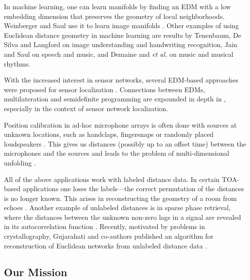 \documentclass[10pt,double]{IEEEtran}
\newcommand{\rev}[1]{{#1}}
\begin{document}
In machine learning, one can learn manifolds by finding an EDM with a low
embedding dimension that preserves the geometry of local neighborhoods.
Weinberger and Saul use it to learn image manifolds
\cite{Weinberger2004}. Other examples of using Euclidean distance geometry in
machine learning are results by Tenenbaum, De Silva and Langford
\cite{Tenenbaum2000} on image understanding and handwriting recognition, Jain
and Saul \cite{jain2004} on speech and music, and Demaine and \emph{et al.}
\cite{Demaine:2009dw} on music and musical rhythms.

With the increased interest in sensor networks, several EDM-based approaches
were proposed for sensor localization
\cite{Alfakih1999,dohetry2001,Biswas2004,Dattorro:2011wa}. 
Connections between EDMs, multilateration and semidefinite programming are
expounded in depth in \cite{So:2007cz}, especially in the context of sensor
network localization.

Position calibration in ad-hoc microphone arrays is often done with sources at
unknown locations, such as handclaps, fingersnaps or randomly placed
loudspeakers
\cite{Crocco:2012eu,Pollefeys:2008ho,Dokmanic:2014tc}. This gives us distances
(possibly up to an offset time) between the microphones and the sources and
leads to the problem of multi-dimensional unfolding
\cite{Schonemann:1970wd}.

All of the above applications work with labeled distance data. In certain TOA-
based applications one loses the labels---the correct permutation of the
distances is no longer known. This arises in reconstructing the geometry of a
room from echoes
\cite{Dokmanic:2013dz}.
Another example of unlabeled distances is in sparse phase retrieval, where the
distances between the unknown non-zero lags in a signal are revealed in its
autocorrelation function \cite{Ranieri:2013tx}. \rev{Recently, motivated by
problems in crystallography, Gujarahati and co-authors published an algorithm for reconstruction of Euclidean networks from
unlabeled distance data \cite{Gujarathi:2014cz}.}



\subsection{Our Mission}
\end{document}
